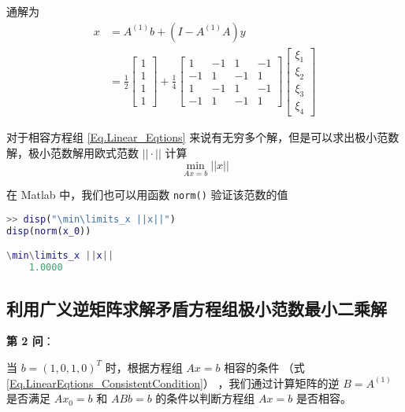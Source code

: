 通解为
\begin{equation}
    \begin{aligned}
        x   &= A^{(1)}b + (I-A^{(1)}A)y \\
            &= \frac{1}{2}
            \begin{bmatrix}
                1 \\ 1 \\ 1 \\ 1
            \end{bmatrix} +
            \frac{1}{4}
            \begin{bmatrix}
                1  & -1 & 1  & -1 \\
                -1 & 1  & -1 & 1  \\
                1  & -1 & 1  & -1 \\
                -1 & 1  & -1 & 1
            \end{bmatrix}
            \begin{bmatrix}
                \xi_1 \\ \xi_2 \\ \xi_3 \\ \xi_4
            \end{bmatrix}
    \end{aligned}
\end{equation}

对于相容方程组 \ref{Eq.Linear_Eqtions} 来说有无穷多个解，但是可以求出极小范数解，极小范数解用欧式范数 $||\cdot||$ 计算
\begin{equation}
    \min\limits_{Ax=b}||x||
\end{equation}

在 Matlab 中，我们也可以用函数 \lstinline|norm()|  验证该范数的值
\begin{lstlisting}[language=Matlab] 
>> disp("\min\limits_x ||x||")
disp(norm(x_0))

\min\limits_x ||x||
    1.0000
\end{lstlisting}


\subsection{利用广义逆矩阵求解矛盾方程组极小范数最小二乘解}

\textbf{第 2 问}：

当 $b=(1,0,1,0)^T$ 时，根据方程组 $Ax=b$ 相容的条件 （式\ref{Eq.LinearEqtions_ConsistentCondition}） ，我们通过计算矩阵的逆 $B=A^{(1)}$ 是否满足 $Ax_0=b$ 和 $ABb=b$ 的条件以判断方程组 $Ax=b$ 是否相容。

